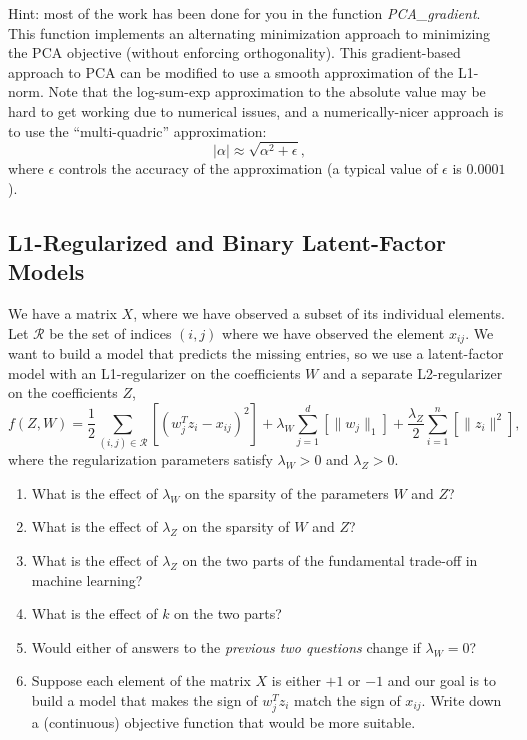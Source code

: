 \documentclass{article}
\def\blu#1{{\color{blu}#1}}
\def\norm#1{\|#1\|}
\def\enum#1{\begin{enumerate}#1\end{enumerate}}
\begin{document}
Hint: most of the work has been done for you in the function \emph{PCA\_gradient}. This function  implements an alternating minimization approach to minimizing the PCA objective (without enforcing orthogonality). This gradient-based approach to PCA can be modified to use a smooth approximation of the L1-norm. Note that the log-sum-exp approximation to the absolute value may be hard to get working due to numerical issues, and a numerically-nicer approach is to use the ``multi-quadric'' approximation:
\[
|\alpha| \approx \sqrt{\alpha^2 + \epsilon},
\]
where $\epsilon$ controls the accuracy of the approximation (a typical value of $\epsilon$ is $0.0001$).

\subsection{L1-Regularized and Binary Latent-Factor Models}

We have a matrix $X$, where we have observed a subset of its individual elements. Let $\mathcal{R}$ be the set of indices $(i,j)$ where we have observed the element $x_{ij}$. We want to build a model that predicts the missing entries, so we use a latent-factor model with an L1-regularizer on the coefficients $W$ and a separate L2-regularizer on the coefficients $Z$,
\[
f(Z,W) = \frac{1}{2}\sum_{(i,j) \in \mathcal{R}}\left[(w_j^Tz_i - x_{ij})^2 \right] + \lambda_W \sum_{j=1}^d \left[\norm{w_j}_1\right] + \frac{\lambda_Z}{2} \sum_{i=1}^n \left[\norm{z_i}^2\right],
\]
where the regularization parameters satisfy $\lambda_W > 0$ and $\lambda_Z > 0$.

\blu{
\enum{
\item What is the effect of $\lambda_W$ on the sparsity of the parameters $W$ and $Z$? 
\item What is the effect of $\lambda_Z$ on the sparsity of $W$ and $Z$?
\item What is the effect of $\lambda_Z$ on the two parts of the fundamental trade-off in machine learning? 
\item What is the effect of $k$ on the two parts?
\item Would either of answers to the \emph{previous two questions} change if $\lambda_W = 0$?
\item Suppose each element of the matrix $X$ is either $+1$ or $-1$ and our goal is to build a model that makes the sign of $w_j^Tz_i$ match the sign of $x_{ij}$. Write down a (continuous) objective function that would be more suitable.
}}
\end{document}
